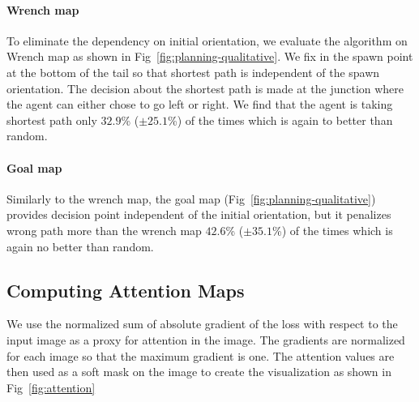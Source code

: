 \paragraph{Wrench map}
To eliminate the dependency on initial orientation, we evaluate the algorithm on Wrench map as shown in Fig~\ref{fig:planning-qualitative}. We fix in the spawn point at the bottom of the tail so that shortest path is independent of the spawn orientation.
The decision about the shortest path is made at the junction where the agent can either chose to go left or right.
We find that the agent is taking shortest path only $32.9$\% ($\pm 25.1$\%) of the times which is again to better than random.

\paragraph{Goal map}
Similarly to the wrench map, the goal map (Fig~\ref{fig:planning-qualitative}) provides decision point independent of the initial orientation, but it penalizes wrong path more than the wrench map $42.6$\% ($\pm 35.1$\%) of the times which is again no better than random.
% 



\subsection{Computing Attention Maps}
We use the normalized sum of absolute gradient of the loss with respect to the input image as a proxy for attention in the image.
The gradients are normalized for each image so that the maximum gradient is one. The attention values are then used as a soft mask on the image to create the visualization as shown in Fig~\ref{fig:attention}

